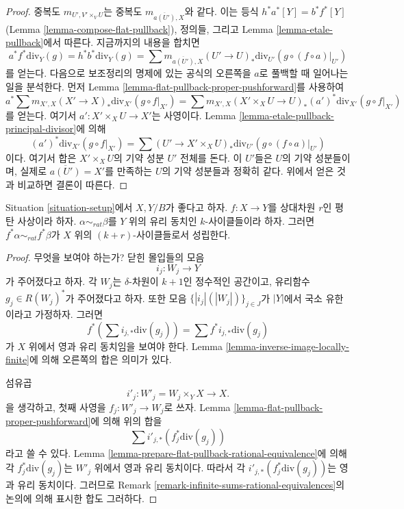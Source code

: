 \begin{proof}
중복도 $m_{U', V' \times_V U}$는 중복도
$m_{\overline{a(U')}, X}$와 같다. 이는 등식
$h^*a^*[Y] = b^*f^*[Y]$(Lemma
\ref{lemma-compose-flat-pullback}), 정의들, 그리고 Lemma
\ref{lemma-etale-pullback}에서 따른다. 지금까지의 내용을 합치면
$$
a^*f^*\text{div}_Y(g) =
h^*b^*\text{div}_Y(g) =
\sum m_{\overline{a(U')}, X}
(U' \to U)_*\text{div}_{U'}(g \circ (f \circ a)|_{U'})
$$
를 얻는다. 다음으로 보조정리의 명제에 있는 공식의 오른쪽을 $a$로
풀백할 때 일어나는 일을 분석한다. 먼저 Lemma
\ref{lemma-flat-pullback-proper-pushforward}를 사용하여
$$
a^*\sum m_{X', X} (X' \to X)_*\text{div}_{X'}(g \circ f|_{X'}) =
\sum m_{X', X} (X' \times_X U \to U)_*(a')^*\text{div}_{X'}(g \circ f|_{X'})
$$
를 얻는다. 여기서 $a' : X' \times_X U \to X'$는 사영이다.
Lemma \ref{lemma-etale-pullback-principal-divisor}에 의해
$$
(a')^*\text{div}_{X'}(g \circ f|_{X'}) =
\sum (U' \to X' \times_X U)_*\text{div}_{U'}(g \circ (f \circ a)|_{U'})
$$
이다. 여기서 합은 $X' \times_X U$의 기약 성분 $U'$ 전체를 돈다.
이 $U'$들은 $U$의 기약 성분들이며, 실제로
$\overline{a(U')} = X'$를 만족하는 $U$의 기약 성분들과 정확히 같다.
위에서 얻은 것과 비교하면 결론이 따른다.
\end{proof}

\begin{lemma}
\label{lemma-flat-pullback-rational-equivalence}
Situation \ref{situation-setup}에서 $X, Y/B$가 좋다고 하자.
$f : X \to Y$를 상대차원 $r$인 평탄 사상이라 하자.
$\alpha \sim_{rat} \beta$를 $Y$ 위의 유리 동치인 $k$-사이클들이라
하자. 그러면 $f^*\alpha \sim_{rat} f^*\beta$가 $X$ 위의
$(k + r)$-사이클들로서 성립한다.
\end{lemma}

\begin{proof}
무엇을 보여야 하는가? 닫힌 몰입들의 모음
$$
i_j : W_j \longrightarrow Y
$$
가 주어졌다고 하자. 각 $W_j$는 $\delta$-차원이 $k + 1$인
정수적인 공간이고, 유리함수 $g_j \in R(W_j)^*$가 주어졌다고 하자.
또한 모음 $\{|i_j|(|W_j|)\}_{j \in J}$가 $|Y|$에서 국소 유한이라고
가정하자. 그러면
$$
f^*(\sum i_{j, *}\text{div}(g_j)) = \sum f^*i_{j, *}\text{div}(g_j)
$$
가 $X$ 위에서 영과 유리 동치임을 보여야 한다. Lemma
\ref{lemma-inverse-image-locally-finite}에 의해 오른쪽의 합은
의미가 있다.

\medskip\noindent
섬유곱
$$
i'_j : W'_j = W_j \times_Y X \longrightarrow X.
$$
을 생각하고, 첫째 사영을 $f_j : W'_j \to W_j$로 쓰자.
Lemma \ref{lemma-flat-pullback-proper-pushforward}에 의해 위의 합을
$$
\sum i'_{j, *}(f_j^*\text{div}(g_j))
$$
라고 쓸 수 있다. Lemma
\ref{lemma-prepare-flat-pullback-rational-equivalence}에 의해 각
$f_j^*\text{div}(g_j)$는 $W'_j$ 위에서 영과 유리 동치이다.
따라서 각 $i'_{j, *}(f_j^*\text{div}(g_j))$는 영과 유리 동치이다.
그러므로 Remark \ref{remark-infinite-sums-rational-equivalences}의
논의에 의해 표시한 합도 그러하다.
\end{proof}

